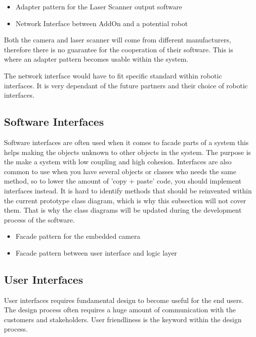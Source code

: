 \documentclass[12pt]{report} %
\begin{document}
\begin{itemize}

\item Adapter pattern for the Laser Scanner output software
\item Network Interface between AddOn and a potential robot

\end{itemize}

Both the camera and laser scanner will come from different manufacturers, therefore there is no guarantee for the cooperation of their software. This is where an adapter pattern becomes usable within the system.

The network interface would have to fit specific standard within robotic interfaces. It is very dependant of the future partners and their choice of robotic interfaces.
  
\subsection{Software Interfaces}
Software interfaces are often used when it comes to facade parts of a system this helps making the objects unknown to other objects in the system. The purpose is the make a system with low coupling and high cohesion. Interfaces are also common to use when you have several objects or classes who needs the same method, so to lower the amount of 'copy + paste' code, you should implement interfaces instead. It is hard to identify methods that should be reinvented within the current prototype class diagram, which is why this subsection will not cover them. That is why the class diagrams will be updated during the development process of the software. 

\begin{itemize}

\item Facade pattern for the embedded camera
\item Facade pattern between user interface and logic layer

\end{itemize}

\subsection{User Interfaces}
User interfaces requires fundamental design to become useful for the end users. The design process often requires a huge amount of communication with the customers and stakeholders. User friendliness is the keyword within the design process. 
\end{document}

